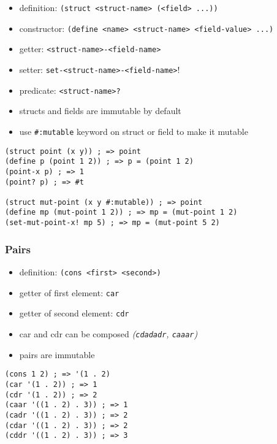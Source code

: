 \documentclass[a4paper,landscape,10pt]{article}
\begin{document}
\begin{multicols*}{2}
  \begin{itemize}
    \item definition: \lstinline[language=Racket]!(struct <struct-name> (<field> ...))!
    \item constructor: \lstinline[language=Racket]!(define <name> <struct-name> <field-value> ...)!
    \item getter: \lstinline[language=Racket]!<struct-name>-<field-name>!
    \item setter: \lstinline[language=Racket]!set-<struct-name>-<field-name>!!
    \item predicate: \lstinline[language=Racket]!<struct-name>?!
    \item structs and fields are immutable by default
    \item use \lstinline[language=Racket]!#:mutable! keyword on struct or field to make it mutable
  \end{itemize}

  \begin{lstlisting}[language=Racket]
(struct point (x y)) ; => point
(define p (point 1 2)) ; => p = (point 1 2)
(point-x p) ; => 1
(point? p) ; => #t

(struct mut-point (x y #:mutable)) ; => point
(define mp (mut-point 1 2)) ; => mp = (mut-point 1 2)
(set-mut-point-x! mp 5) ; => mp = (mut-point 5 2)
\end{lstlisting}

  \subsubsection{Pairs}

  \begin{itemize}
    \item definition: \lstinline[language=Racket]!(cons <first> <second>)!
    \item getter of first element: \lstinline[language=Racket]!car!
    \item getter of second element: \lstinline[language=Racket]!cdr!
    \item car and cdr can be composed \textit{(\lstinline[language=Racket]!cdadadr!, \lstinline[language=Racket]!caaar!)}
    \item pairs are immutable
  \end{itemize}

  \begin{lstlisting}[language=Racket, morekeywords={caar, cadr, cdar, cddr}]
(cons 1 2) ; => '(1 . 2)
(car '(1 . 2)) ; => 1
(cdr '(1 . 2)) ; => 2
(caar '((1 . 2) . 3)) ; => 1
(cadr '((1 . 2) . 3)) ; => 2
(cdar '((1 . 2) . 3)) ; => 2
(cddr '((1 . 2) . 3)) ; => 3
\end{lstlisting}


\end{multicols*}
\end{document}
